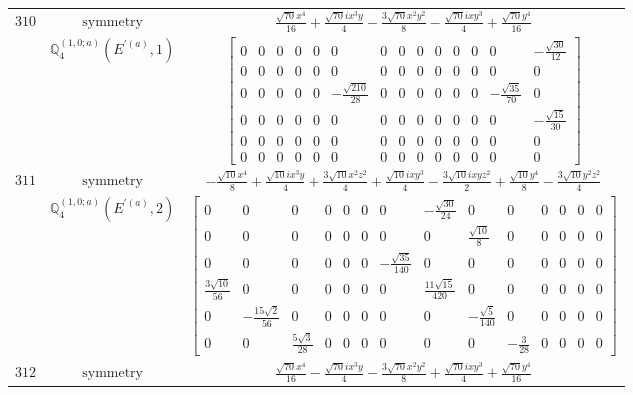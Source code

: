 \documentclass[fleqn,8pt,landscape]{jsarticle}
\begin{document}
\begin{longtable}{ccc}
$ 310 $ & $ \text{symmetry} $ & $ \frac{\sqrt{70} x^{4}}{16} + \frac{\sqrt{70} i x^{3} y}{4} - \frac{3 \sqrt{70} x^{2} y^{2}}{8} - \frac{\sqrt{70} i x y^{3}}{4} + \frac{\sqrt{70} y^{4}}{16} $ \\
$  $ & $ \mathbb{Q}_{4}^{(1,0;a)}(E^{\prime(a)},1) $ & $ \begin{bmatrix} 0 & 0 & 0 & 0 & 0 & 0 & 0 & 0 & 0 & 0 & 0 & 0 & 0 & - \frac{\sqrt{30}}{12} \\ 0 & 0 & 0 & 0 & 0 & 0 & 0 & 0 & 0 & 0 & 0 & 0 & 0 & 0 \\ 0 & 0 & 0 & 0 & 0 & - \frac{\sqrt{210}}{28} & 0 & 0 & 0 & 0 & 0 & 0 & - \frac{\sqrt{35}}{70} & 0 \\ 0 & 0 & 0 & 0 & 0 & 0 & 0 & 0 & 0 & 0 & 0 & 0 & 0 & - \frac{\sqrt{15}}{30} \\ 0 & 0 & 0 & 0 & 0 & 0 & 0 & 0 & 0 & 0 & 0 & 0 & 0 & 0 \\ 0 & 0 & 0 & 0 & 0 & 0 & 0 & 0 & 0 & 0 & 0 & 0 & 0 & 0 \end{bmatrix} $ \\ \hline
$ 311 $ & $ \text{symmetry} $ & $ - \frac{\sqrt{10} x^{4}}{8} + \frac{\sqrt{10} i x^{3} y}{4} + \frac{3 \sqrt{10} x^{2} z^{2}}{4} + \frac{\sqrt{10} i x y^{3}}{4} - \frac{3 \sqrt{10} i x y z^{2}}{2} + \frac{\sqrt{10} y^{4}}{8} - \frac{3 \sqrt{10} y^{2} z^{2}}{4} $ \\
$  $ & $ \mathbb{Q}_{4}^{(1,0;a)}(E^{\prime(a)},2) $ & $ \begin{bmatrix} 0 & 0 & 0 & 0 & 0 & 0 & 0 & - \frac{\sqrt{30}}{24} & 0 & 0 & 0 & 0 & 0 & 0 \\ 0 & 0 & 0 & 0 & 0 & 0 & 0 & 0 & \frac{\sqrt{10}}{8} & 0 & 0 & 0 & 0 & 0 \\ 0 & 0 & 0 & 0 & 0 & 0 & - \frac{\sqrt{35}}{140} & 0 & 0 & 0 & 0 & 0 & 0 & 0 \\ \frac{3 \sqrt{10}}{56} & 0 & 0 & 0 & 0 & 0 & 0 & \frac{11 \sqrt{15}}{420} & 0 & 0 & 0 & 0 & 0 & 0 \\ 0 & - \frac{15 \sqrt{2}}{56} & 0 & 0 & 0 & 0 & 0 & 0 & - \frac{\sqrt{5}}{140} & 0 & 0 & 0 & 0 & 0 \\ 0 & 0 & \frac{5 \sqrt{3}}{28} & 0 & 0 & 0 & 0 & 0 & 0 & - \frac{3}{28} & 0 & 0 & 0 & 0 \end{bmatrix} $ \\ \hline
$ 312 $ & $ \text{symmetry} $ & $ \frac{\sqrt{70} x^{4}}{16} - \frac{\sqrt{70} i x^{3} y}{4} - \frac{3 \sqrt{70} x^{2} y^{2}}{8} + \frac{\sqrt{70} i x y^{3}}{4} + \frac{\sqrt{70} y^{4}}{16} $ \\

\end{longtable}
\end{document}
